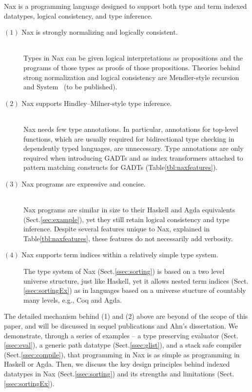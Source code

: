 Nax is a programming language designed to support both type and
term indexed datatypes,
logical consistency, and type inference.
\begin{description}
\item[$(1)$ Nax is strongly normalizing and logically consistent.]~\\
Types in Nax can be given logical interpretations as propositions
and the programs of those types as proofs of those propositions.
Theories behind strong normalization and logical consistency are
Mendler-style recursion \cite{AhnShe11} and System \Fi\ (to be published).

\item[$(2)$ Nax supports Hindley--Milner-style type inference.]~\\
Nax needs few type annotations. In particular,
annotations for top-level functions, which are usually
required for bidirectional type checking in dependently typed languages,
are unnecessary.
Type annotations are only required when introducing GADTs and as
index transformers attached to pattern matching constructs for GADTs
(Table\;\ref{tbl:naxfeatures}).

\item[$(3)$ Nax programs are expressive and concise.]~\\
Nax programs are similar in size to their Haskell and Agda equivalents
(Sect.\;\ref{sec:example}), yet they still retain logical consistency
and type inference. Despite several features unique to Nax,
explained in Table\;\ref{tbl:naxfeatures}, these features
do not necessarily add verbosity.

\item[$(4)$ Nax supports term indices within a relatively simple type system.]
The type system of Nax (Sect.\;\ref{ssec:sorting}) is based on a
two level universe structure, just like Haskell, yet it allows nested term indices
(Sect.\;\ref{ssec:sortingEx}) as in languages
based on a universe stucture of countably many levels, e.g., Coq and Agda.
\end{description}

The detailed mechanism behind (1) and (2) above are beyond of the scope of
this paper, and will be discussed in sequel publications and Ahn's dissertation.
We demonstrate, through a series of examples -- a type preserving evaluator (Sect.\;\ref{ssec:eval}),
a generic path datatype (Sect.\;\ref{ssec:glist}), and
a stack safe compiler (Sect.\;\ref{ssec:compile}), that programming in Nax 
is as simple as programming in Haskell or Agda.
Then, we discuss the key design principles behind indexed datatypes in Nax
(Sect.\;\ref{ssec:sorting}) and its strengths and limitations
(Sect.\;\ref{ssec:sortingEx}).

